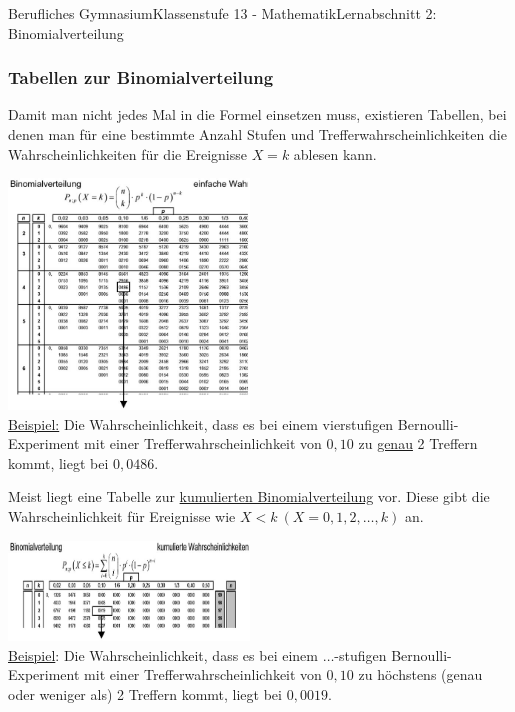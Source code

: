 \documentclass[11pt,twocolumn,oneside,openany,headings=optiontotoc,11pt,numbers=noenddot]{article}
\begin{document}
\begin{worksheet}{Berufliches Gymnasium}{Klassenstufe 13 - Mathematik}{Lernabschnitt 2: Binomialverteilung}
		\subsubsection{Tabellen zur Binomialverteilung}
		Damit man nicht jedes Mal in die Formel einsetzen muss, existieren Tabellen, bei denen man für eine bestimmte Anzahl Stufen und Trefferwahrscheinlichkeiten die Wahrscheinlichkeiten für die Ereignisse \(X = k\) ablesen kann.\\
		\par\noindent
		\includegraphics[width=0.48\textwidth]{../99_Bilder/04_WKR/binomtab.jpg}\\
		\underline{Beispiel:} Die Wahrscheinlichkeit, dass es bei einem vierstufigen Bernoulli-Experiment mit einer Trefferwahrscheinlichkeit von \(0,10\) zu \underline{genau} 2 Treffern kommt, liegt bei \(0,0486\).\\
		\par\noindent
		Meist liegt eine Tabelle zur \underline{kumulierten Binomialverteilung} vor. Diese gibt die Wahrscheinlichkeit für Ereignisse wie \(X < k\ (X = {0, 1, 2, \ldots, k})\) an.\\
		\par\noindent
		\includegraphics[width=0.48\textwidth]{../99_Bilder/04_WKR/binomtabKum.jpg}\\
		\underline{Beispiel}: Die Wahrscheinlichkeit, dass es bei einem $\ldots$-stufigen Bernoulli-Experiment mit einer Trefferwahrscheinlichkeit von \(0,10\) zu höchstens (genau oder weniger als) 2 Treffern kommt, liegt bei \(0,0019\).\\

\end{worksheet}
\end{document}
